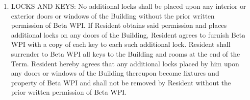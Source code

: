 \documentclass[legalpaper, 12pt]{article} \usepackage{lease}
\begin{document}
\begin{enumerate}
        \item LOCKS AND KEYS: No additional locks shall be placed upon any
                interior or exterior doors or windows of the Building without
                the prior written permission of Beta WPI\@.  If Resident obtains
                said permission and places additional locks on any doors of the
                Building, Resident agrees to furnish Beta WPI with a copy of
                each key to each such additional lock.  Resident shall surrender
                to Beta WPI all keys to the Building and rooms at the end of the
                Term.  Resident hereby agrees that any additional locks placed
                by him upon any doors or windows of the Building thereupon
                become fixtures and property of Beta WPI and shall not be
                removed by Resident without the prior written permission of Beta
                WPI\@.


\end{enumerate}
\end{document}
